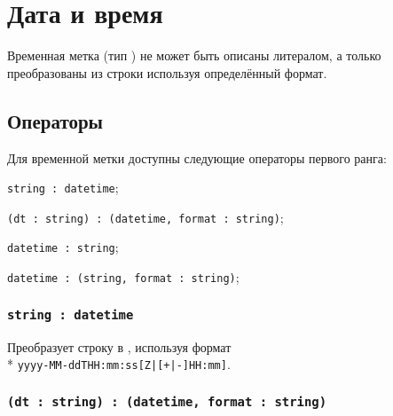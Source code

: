 \section{Дата и время}

Временная метка (тип ) не может быть описаны литералом, а только преобразованы из строки используя определённый формат.

\subsection{Операторы}

Для временной метки доступны следующие операторы первого ранга:
\begin{icItems}
	\item \lstinline|string : datetime|;
	\item \lstinline|(dt : string) : (datetime, format : string)|;
	\item \lstinline|datetime : string|;
	\item \lstinline|datetime : (string, format : string)|;
\end{icItems}

\subsubsection{\lstinline|string : datetime|}

Преобразует строку в , используя формат \\* \lstinline`yyyy-MM-ddTHH:mm:ss[Z|[+|-]HH:mm]`.

\subsubsection{\lstinline|(dt : string) : (datetime, format : string)|}

